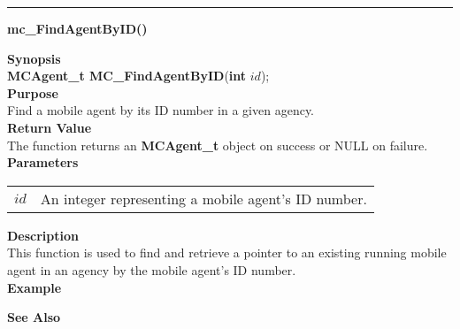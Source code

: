 \noindent
\vspace{5pt}
\rule{6.5in}{0.015in}
\noindent
{\LARGE \bf mc\_FindAgentByID()}\\
{}
\label{api:mc_FindAgentByID()}

\noindent
{\bf Synopsis}\\
{\bf MCAgent\_t MC\_FindAgentByID}({\bf int} $id$);\\

\noindent
{\bf Purpose}\\
Find a mobile agent by its ID number in a given agency.\\

\noindent
{\bf Return Value}\\
The function returns an {\bf MCAgent\_t} object on success or NULL on failure.\\

\noindent
{\bf Parameters}
\vspace{-0.1in}
\begin{description}
\item               
\begin{tabular}{p{10 mm}p{145 mm}}
$id$ & An integer representing a mobile agent's ID number.
\end{tabular}
\end{description}

\noindent
{\bf Description}\\
This function is used to find and retrieve a pointer to an existing running 
mobile agent in an agency by the mobile agent's ID number.\\

\noindent
{\bf Example}\\
\noindent
{\footnotesize}

\noindent
{\bf See Also}\\

